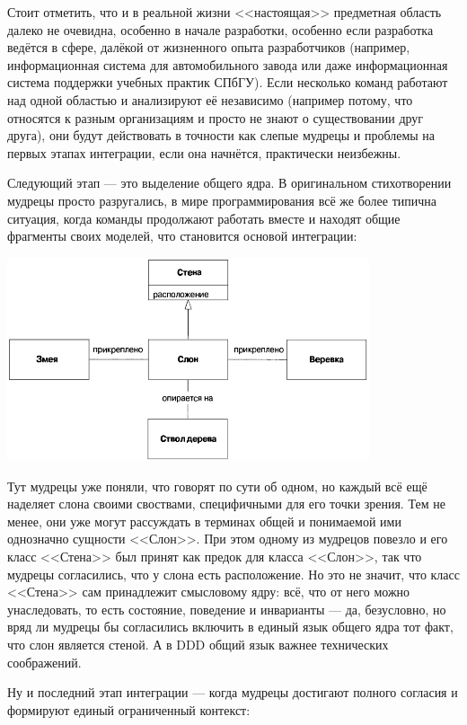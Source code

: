 \documentclass{../../text-style}
\begin{document}
Стоит отметить, что и в реальной жизни <<настоящая>> предметная область далеко не очевидна, особенно в начале разработки, особенно если разработка ведётся в сфере, далёкой от жизненного опыта разработчиков (например, информационная система для автомобильного завода или даже информационная система поддержки учебных практик СПбГУ). Если несколько команд работают над одной областью и анализируют её независимо (например потому, что относятся к разным организациям и просто не знают о существовании друг друга), они будут действовать в точности как слепые мудрецы и проблемы на первых этапах интеграции, если она начнётся, практически неизбежны.

Следующий этап --- это выделение общего ядра. В оригинальном стихотворении мудрецы просто разругались, в мире программирования всё же более типична ситуация, когда команды продолжают работать вместе и находят общие фрагменты своих моделей, что становится основой интеграции:

\begin{center}
    \includegraphics[width=0.8\textwidth]{elephantSharedKernel.png}
\end{center}

Тут мудрецы уже поняли, что говорят по сути об одном, но каждый всё ещё наделяет слона своими своствами, специфичными для его точки зрения. Тем не менее, они уже могут рассуждать в терминах общей и понимаемой ими однозначно сущности <<Слон>>. При этом одному из мудрецов повезло и его класс <<Стена>> был принят как предок для класса <<Слон>>, так что мудрецы согласились, что у слона есть расположение. Но это не значит, что класс <<Стена>> сам принадлежит смысловому ядру: всё, что от него можно унаследовать, то есть состояние, поведение и инварианты --- да, безусловно, но вряд ли мудрецы бы согласились включить в единый язык общего ядра тот факт, что слон является стеной. А в DDD общий язык важнее технических соображений.

Ну и последний этап интеграции --- когда мудрецы достигают полного согласия и формируют единый ограниченный контекст:
\end{document}
